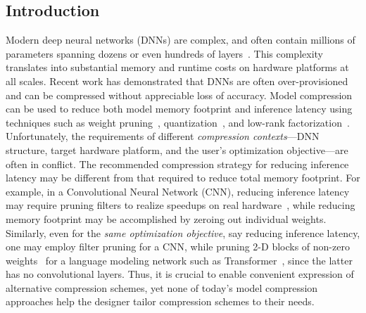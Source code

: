\begin{refsection}

\section{Introduction}
\label{sec:intro}

Modern deep neural networks (DNNs) are complex,
and often contain millions of parameters spanning
dozens or even hundreds of layers~\cite{he2016deep,huang:2017}.
%
This complexity translates into substantial memory and runtime costs
on hardware platforms at all scales.
%
Recent work has demonstrated that DNNs are often over-provisioned and can be compressed without appreciable loss of accuracy.
Model compression can be used to
reduce both model memory footprint and inference latency using techniques such as
weight pruning~\cite{han2015learning,luo2017thinet},
quantization~\cite{gupta2015deep}, and low-rank
factorization~\cite{jaderberg2014speeding,denton2014exploiting}.
%
Unfortunately, the requirements of
different {\em compression contexts}---DNN structure,
target hardware platform, and the user's optimization objective---are often in conflict.
%
The recommended compression strategy for reducing inference latency
may be different from that required to reduce total memory footprint.
%
For example, in a Convolutional Neural Network (CNN),
reducing inference latency may require pruning filters to realize speedups on real hardware~\cite{li2016pruning}, while reducing memory footprint may be accomplished by zeroing out individual weights.
%
Similarly, even for the {\em same optimization objective},
say reducing inference latency, one may employ filter pruning for a CNN,
while pruning 2-D blocks of non-zero weights~\cite{gray:2017} for a
language modeling network such as Transformer~\cite{vaswani:2017},
since the latter has no convolutional layers.
%
Thus, it is crucial to enable convenient expression of 
alternative compression schemes, yet
none of today's model compression approaches help the designer
tailor compression schemes to their needs.



\end{refsection}
